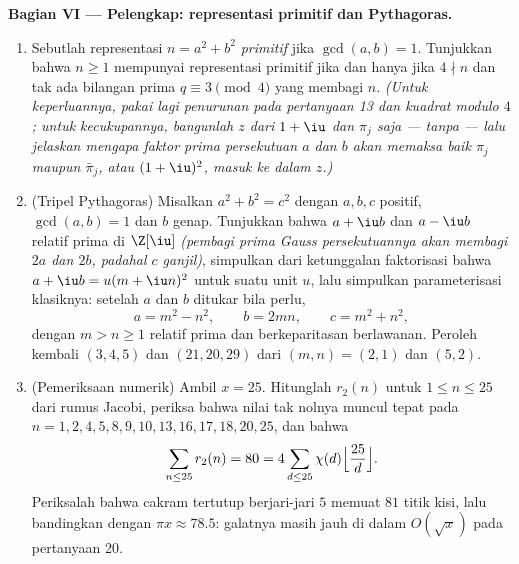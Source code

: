 \begin{problem}
\medskip
\noindent\textbf{Bagian VI --- Pelengkap: representasi primitif
dan Pythagoras.}
\begin{enumerate}[resume]
  \item Sebutlah representasi $n = a^2 + b^2$ \emph{primitif}
        jika $\gcd(a, b) = 1$. Tunjukkan bahwa $n \geq 1$ mempunyai
        representasi primitif jika dan hanya jika $4 \nmid n$ dan tak ada bilangan prima
        $q \equiv 3 \pmod 4$ yang membagi $n$. \emph{(Untuk
        keperluannya, pakai lagi penurunan pada pertanyaan 13 dan kuadrat
        modulo $4$; untuk kecukupannya, bangunlah $z$ dari $1 + \iu$
        dan $\pi_j$ saja --- tanpa  --- lalu jelaskan
        mengapa faktor prima persekutuan $a$ dan $b$ akan memaksa
        baik $\pi_j$ maupun $\bar\pi_j$, atau $(1+\iu)^2$, masuk ke
        dalam $z$.)}
  \item (Tripel Pythagoras) Misalkan $a^2 + b^2 = c^2$ dengan $a, b,
        c$ positif, $\gcd(a, b) = 1$ dan $b$ genap. Tunjukkan bahwa
        $a + \iu b$ dan $a - \iu b$ relatif prima di $\Z[\iu]$
        \emph{(pembagi prima Gauss persekutuannya akan membagi
        $2a$ dan $2b$, padahal $c$ ganjil)}, simpulkan dari ketunggalan
        faktorisasi bahwa $a + \iu b = u(m + \iu n)^2$ untuk suatu
        unit $u$, lalu simpulkan parameterisasi klasiknya:
        setelah $a$ dan $b$ ditukar bila perlu,
        \[
        a = m^2 - n^2, \qquad b = 2mn, \qquad c = m^2 + n^2,
        \]
        dengan $m > n \geq 1$ relatif prima dan berkeparitasan berlawanan.
        Peroleh kembali $(3, 4, 5)$ dan $(21, 20, 29)$ dari $(m, n) =
        (2, 1)$ dan $(5, 2)$.
  \item (Pemeriksaan numerik) Ambil $x = 25$. Hitunglah
        $r_2(n)$ untuk $1 \leq n \leq 25$ dari rumus Jacobi,
        periksa bahwa nilai tak nolnya muncul tepat pada $n = 1,
        2, 4, 5, 8, 9, 10, 13, 16, 17, 18, 20, 25$, dan bahwa
        \[
        \sum_{n \leq 25} r_2(n) = 80
        = 4\sum_{d \leq 25}\chi(d)
        \Bigl\lfloor\frac{25}d\Bigr\rfloor .
        \]
        Periksalah bahwa cakram tertutup berjari-jari $5$ memuat $81$
        titik kisi, lalu bandingkan dengan $\pi x \approx 78.5$:
        galatnya masih jauh di dalam $O(\sqrt x)$ pada pertanyaan
        20.

\end{enumerate}
\end{problem}
